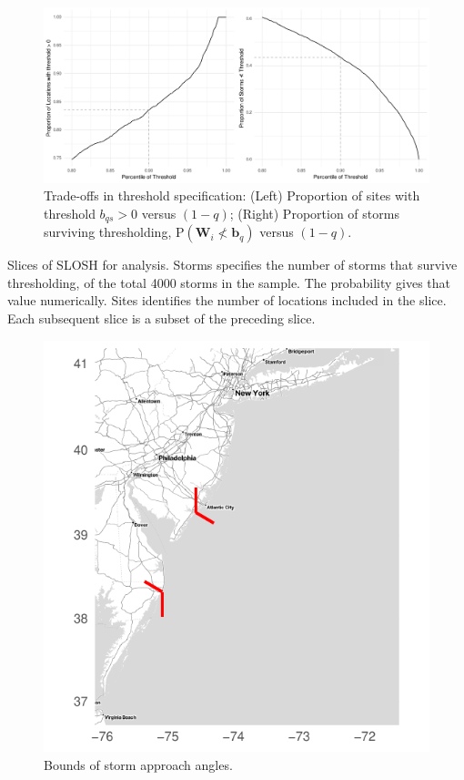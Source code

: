 \begin{figure}[ht]
    \centering
    \caption{Trade-offs in threshold specification:
    (Left) Proportion of sites with threshold $b_{qs} > 0$ versus $(1 - q)$; 
    (Right) Proportion of storms surviving thresholding, $\text{P}(\bm{W}_i \not< \bm{b}_q)$ versus $(1 - q)$.
    \label{fig:thresholdselection}}
    \includegraphics[width=0.9\linewidth]{plots/explore_threshold}
\end{figure}

\begin{table}[htb]
    \centering
    \caption{Slices of SLOSH for analysis.  Storms specifies the number of storms that survive thresholding,
    of the total \num{4000} storms in the sample.  The probability gives that value numerically. Sites 
    identifies the number of locations included in the slice. Each subsequent slice is a subset of the  
    preceding slice.\label{tab:datasets}}
    
\end{table}

\begin{figure}[htb]
    \centering
    \caption{Bounds of storm approach angles.\label{fig:slosh_bounds}}
    \includegraphics{plots/slosh_bounds}
\end{figure}

